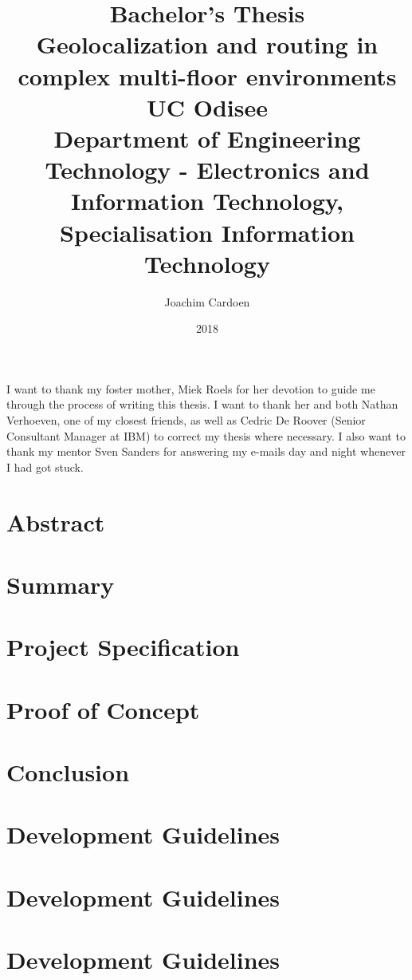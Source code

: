 \documentclass[11pt,twoside]{report}
\title{
    {\large Bachelor's Thesis}\\
    {Geolocalization and routing in complex multi-floor environments}\\
    {\large UC Odisee}\\
    {\large Department of Engineering Technology - Electronics and Information Technology, Specialisation Information Technology}
}
\author{Joachim Cardoen}
\date{2018}
\begin{document}
\begin{titlepage}
\maketitle
\end{titlepage}
\begin{center}
I want to thank my foster mother, Miek Roels for her devotion to guide me through the process of writing this thesis. I want to thank her and both Nathan Verhoeven, one of my closest friends, as well as Cedric De Roover (Senior Consultant Manager at IBM) to correct my thesis where necessary. I also want to thank my mentor Sven Sanders for answering my e-mails day and night whenever I had got stuck.
\end{center}
\chapter*{Abstract}


\tableofcontents

\chapter{Summary}


\chapter{Project Specification}


\chapter{Proof of Concept}


\chapter{Conclusion}


\appendix
\chapter{Development Guidelines}

\chapter{Development Guidelines}

\chapter{Development Guidelines}


\newpage
\printbibliography
\end{document}
